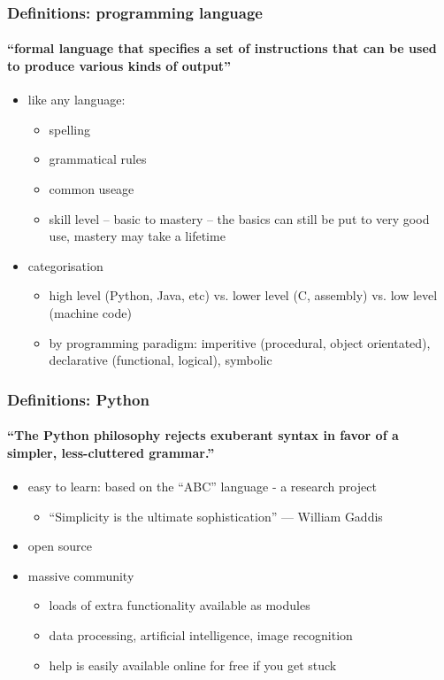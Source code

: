 \documentclass{beamer}
\begin{document}
    \begin{frame}
	    \frametitle{Definitions: programming language}
	    \framesubtitle{``formal language that specifies a set of instructions that can be used to produce various kinds of output''}
	    \begin{itemize}
		    \item like any language:
			    \begin{itemize}
				    \item spelling
				    \item grammatical rules
				    \item common useage
				    \item skill level -- basic to mastery -- the basics can still be put to very good use, mastery may take a lifetime
			    \end{itemize}
		    \item categorisation
			    \begin{itemize}
				    \item high level (Python, Java, etc) vs. lower level (C, assembly) vs. low level (machine code)
				    \item by programming paradigm: imperitive (procedural, object orientated), declarative (functional, logical), symbolic
			    \end{itemize} 
	    \end{itemize}
    \end{frame}

    \begin{frame}
	    \frametitle{Definitions: Python}
	    \framesubtitle{``The Python philosophy rejects exuberant syntax in favor of a simpler, less-cluttered grammar.''}
	    \begin{itemize}
		    \item easy to learn: based on the ``ABC'' language - a research project 
			    \begin{itemize}
				    \item ``Simplicity is the ultimate sophistication'' --- William Gaddis
			    \end{itemize}
		    \item open source
		    \item massive community
			    \begin{itemize}
				    \item loads of extra functionality available as modules
				    \item data processing, artificial intelligence, image recognition
				    \item help is easily available online for free if you get stuck
			    \end{itemize}
	    \end{itemize}
    \end{frame}
\end{document}
